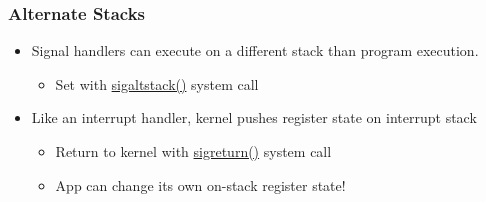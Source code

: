\begin{frame}[fragile]
    \frametitle{Alternate Stacks}
    \begin{itemize}
        \item Signal handlers can execute on a different stack than program execution.
        \begin{itemize}
            \item Set with \href{https://linux.die.net/man/3/sigaltstack}{sigaltstack()} system call
        \end{itemize} \pause
        \item Like an interrupt handler, kernel pushes register state on interrupt stack
        \begin{itemize}
            \item Return to kernel with \href{https://man7.org/linux/man-pages/man2/sigreturn.2.html}{sigreturn()} system call
            \item App can change its own on-stack register state!
        \end{itemize}
    \end{itemize}
\end{frame}
% 
% 
